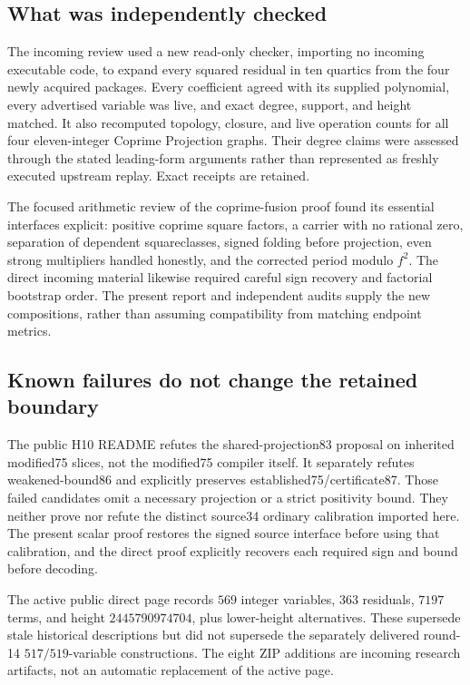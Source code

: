 \subsection{What was independently checked}
The incoming review used a new read-only checker, importing no incoming executable code, to expand every squared residual in ten quartics from the four newly acquired packages. Every coefficient agreed with its supplied polynomial, every advertised variable was live, and exact degree, support, and height matched. It also recomputed topology, closure, and live operation counts for all four eleven-integer Coprime Projection graphs. Their degree claims were assessed through the stated leading-form arguments rather than represented as freshly executed upstream replay. Exact receipts are retained.

The focused arithmetic review of the coprime-fusion proof found its essential interfaces explicit: positive coprime square factors, a carrier with no rational zero, separation of dependent squareclasses, signed folding before projection, even strong multipliers handled honestly, and the corrected period modulo $f^2$. The direct incoming material likewise required careful sign recovery and factorial bootstrap order. The present report and independent audits supply the new compositions, rather than assuming compatibility from matching endpoint metrics.

\subsection{Known failures do not change the retained boundary}
The public H10 README refutes the shared-projection83 proposal on inherited modified75 slices, not the modified75 compiler itself. It separately refutes weakened-bound86 and explicitly preserves established75/certificate87. Those failed candidates omit a necessary projection or a strict positivity bound. They neither prove nor refute the distinct source34 ordinary calibration imported here. The present scalar proof restores the signed source interface before using that calibration, and the direct proof explicitly recovers each required sign and bound before decoding.

The active public direct page records $569$ integer variables, $363$ residuals, $7197$ terms, and height $2445790974704$, plus lower-height alternatives. These supersede stale historical descriptions but did not supersede the separately delivered round-14 $517/519$-variable constructions. The eight ZIP additions are incoming research artifacts, not an automatic replacement of the active page.
